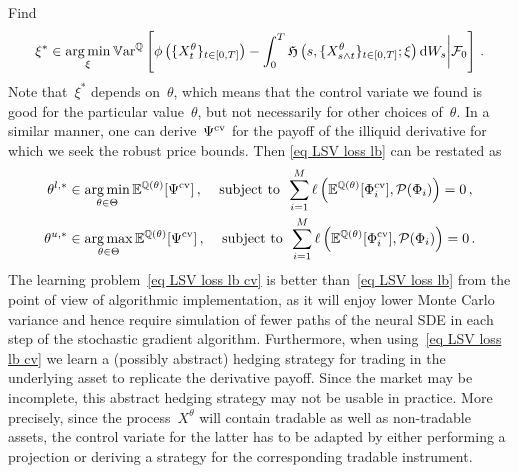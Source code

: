 Find  
\begin{equation}\label{eq loss cv}
\xi^{\ast} \in \operatorname*{arg\,min}_{\xi} \mathbb{V}\mathrm{ar}^{\mathbb{Q}}\left[\phi\left(\{X^{\theta}_t\}_{t\in[0,T]}\right) -  \int_0^T \mathfrak{H}\left(s,\{X^{\theta}_{s\wedge t}\}_{t\in[0,T]};\xi\right) \mathrm{d} W_s \bigg | \mathcal{F}_0\right]\,.
\end{equation}
Note that~$\xi^\ast$ depends on~$\theta$, which means that the control variate we found is good for the particular value~$\theta$, but not necessarily for other choices of~$\theta$. 
In a similar manner, one can derive~$\Psi^{\textup{cv}}$ for the payoff of the  illiquid derivative for which we seek 
the robust price bounds.  Then \eqref{eq LSV loss lb} can be restated as 
\begin{equation}\label{eq LSV loss lb cv}
\begin{split}
	 \theta^{l,\ast} & \in \operatorname*{arg\,min}_{\theta \in \Theta} \mathbb{E}^{\mathbb{Q}(\theta)}[\Psi^{\textup{cv}}]\,,\,\,\,~\text{ subject to}\,\,\, \sum_{i=1}^M \ell\left(\mathbb{E}^{\mathbb{Q}(\theta)}[\Phi_i^{\textup{cv}}], \mathcal{P}(\Phi_i)\right) = 0\,, \\
\theta^{u,\ast} & \in \operatorname*{arg\,max}_{\theta \in \Theta} \mathbb{E}^{\mathbb{Q}(\theta)}[\Psi^{\textup{cv}}]\,,\,\,\,~\text{ subject to}\,\,\, \sum_{i=1}^M \ell\left(\mathbb{E}^{\mathbb{Q}(\theta)}[\Phi_i^{\textup{cv}}], \mathcal{P}(\Phi_i)\right) = 0\,. 
\end{split}	
\end{equation}
The learning problem~\eqref{eq LSV loss lb cv} is better  than~\eqref{eq LSV loss lb} from the point of view of algorithmic implementation, as it will enjoy lower Monte Carlo variance and hence require simulation of fewer paths of the neural SDE in each step of the stochastic gradient algorithm. 
Furthermore, when using~\eqref{eq LSV loss lb cv} we learn a (possibly abstract)
hedging strategy for trading in the underlying asset 
to replicate the derivative payoff. 
Since the market may be incomplete, this abstract hedging strategy may not be usable in practice. 
More precisely, since the process~$X^\theta$ will contain tradable as well as non-tradable assets, the control variate for the latter has to be adapted by either performing a projection or deriving a strategy for the corresponding tradable instrument.


